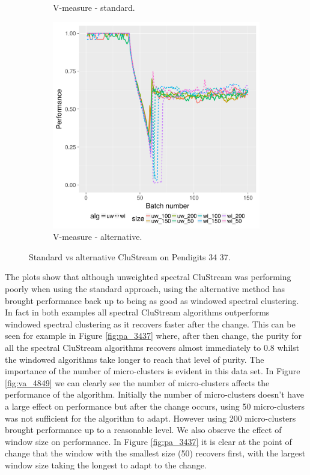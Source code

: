 \begin{figure}[H]
\begin{subfigure}[b]{0.47\textwidth}
                 \caption{V-measure - standard.}
                 \label{fig:vs_3437}
        \end{subfigure}
        \begin{subfigure}[b]{0.47\textwidth}
                 \includegraphics[width=\textwidth]{standard_alt/evolving_pen_34_37_alternative_vmeasure.png}
                \caption{V-measure - alternative.}
                \label{fig:va_3437}
        \end{subfigure}
\caption{Standard vs alternative CluStream on Pendigits 34 37.}
\label{fig:standard_alternative_3437}
\end{figure}

The plots show that although unweighted spectral CluStream was performing poorly when using the standard approach, using the alternative method has brought performance back up to being as good as windowed spectral clustering. In fact in both examples all spectral CluStream algorithms outperforms windowed spectral clustering as it recovers faster after the change. This can be seen for example in Figure \ref{fig:pa_3437} where, after then change, the purity for all the spectral CluStream algorithms recovers almost immediately to 0.8 whilst the windowed algorithms take longer to reach that level of purity.
The importance of the number of micro-clusters is evident in this data set.  In Figure \ref{fig:va_4849} we can clearly see the number of micro-clusters affects the performance of the algorithm. Initially the number of micro-clusters doesn't have a large effect on performance but after the change occurs, using 50 micro-clusters was not sufficient for the algorithm to adapt. However using 200 micro-clusters brought performance up to a reasonable level.  We also observe the effect of window size on performance. In Figure \ref{fig:pa_3437} it is clear at the point of change that the window with the smallest size (50) recovers first, with the largest window size taking the longest to adapt to the change. 

